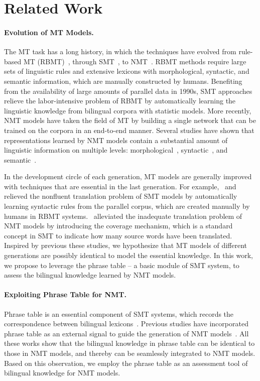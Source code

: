 \documentclass[11pt,a4paper]{article}
\begin{document}
\section{Related Work}

\paragraph{Evolution of MT Models.}
The MT task has a long history, in which the techniques have evolved from rule-based MT (RBMT)~\cite{hayes1985rule,sato1992example}, through SMT~\cite{brown:1993:CL,Och:2004:CL}, to NMT~\cite{Sutskever:2014:NIPS,Bahdanau:2015:ICLR}. RBMT methods require large sets of linguistic rules and extensive lexicons with morphological, syntactic, and semantic information, which are manually constructed by humans. Benefiting from the availability of large amounts of parallel data in 1990s, SMT approaches relieve the labor-intensive problem of RBMT by automatically learning the linguistic knowledge from bilingual corpora with statistic models.
More recently, NMT models have taken the field of MT by building a single network that can be trained on the corpora in an end-to-end manner. 
Several studies have shown that representations learned by NMT models contain a substantial amount of linguistic information on multiple levels: morphological~\cite{belinkov:2017:ACL}, syntactic~\cite{shi:2016:EMNLP}, and semantic~\cite{Hill:2017:MT}.

In the development circle of each generation, MT models are generally improved with techniques that are essential in the last generation. For example,~ and~ relieved the nonfluent translation problem of SMT models by automatically learning syntactic rules from the parallel corpus, which are created manually by humans in RBMT systems.~ alleviated the inadequate translation problem of NMT models by introducing the coverage mechanism, which is a standard concept in SMT to indicate how many source words have been translated.
Inspired by previous these studies, we hypothesize that MT models of different generations are possibly identical to model the essential knowledge. In this work, we propose to leverage the phrase table -- a basic module of SMT system, to assess the bilingual knowledge learned by NMT models.


\paragraph{Exploiting Phrase Table for NMT.}
Phrase table is an essential component of SMT systems, which records the correspondence between bilingual lexicons~\cite{koehn2009statistical}. 
Previous studies have incorporated phrase table as an external signal to guide the generation of NMT models~\cite{wang:2017:aaai,zhang2018prior,zhao2018phrase,guo2019non}. 
All these works show that the bilingual knowledge in phrase table can be identical to those in NMT models, and thereby can be seamlessly integrated to NMT models. Based on this observation, we employ the phrase table as an assessment tool of bilingual knowledge for NMT models. 
\end{document}
